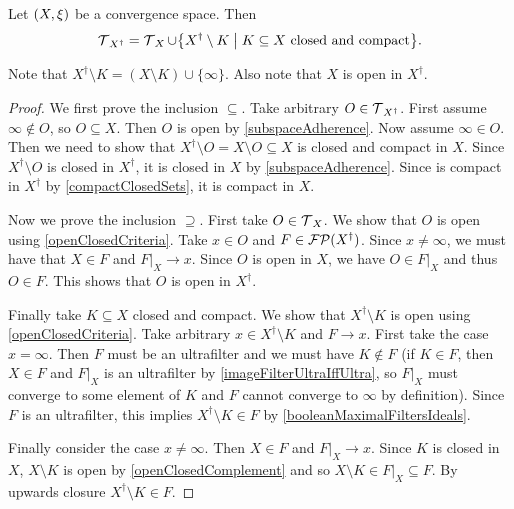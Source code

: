 \begin{proposition} \label{topologyOnePointCompactification}
Let $\sSet{X, \xi}$ be a convergence space. Then
\[ \topology_{X^\dagger} = \topology_X \cup \setbuilder{X^\dagger \setminus K}{\text{$K\subseteq X$ closed and compact}}. \]
\end{proposition}
Note that $X^\dagger \setminus K = (X\setminus K)\cup \{\infty\}$. Also note that $X$ is open in $X^\dagger$.
\begin{proof}
We first prove the inclusion $\boxed{\subseteq}$. Take arbitrary $O\in \operatorname{\mathcal{T}}_{X^\dagger}$. First assume $\infty\notin O$, so $O\subseteq X$. Then $O$ is open by \ref{subspaceAdherence}.
Now assume $\infty\in O$. Then we need to show that $X^\dagger \setminus O = X\setminus O \subseteq X$ is closed and compact in $X$. Since $X^\dagger \setminus O$ is closed in $X^\dagger$, it is closed in $X$ by \ref{subspaceAdherence}. Since is compact in $X^\dagger$ by \ref{compactClosedSets}, it is compact in $X$.

Now we prove the inclusion $\boxed{\supseteq}$. First take $O\in \operatorname{\mathcal{T}}_X$. We show that $O$ is open using \ref{openClosedCriteria}. Take $x\in O$ and $F\in \operatorname{\mathcal{FP}}(X^\dagger)$. Since $x\neq \infty$, we must have that $X\in F$ and $F|_X\to x$. Since $O$ is open in $X$, we have $O\in F|_X$ and thus $O\in F$. This shows that $O$ is open in $X^\dagger$.

Finally take $K\subseteq X$ closed and compact. We show that $X^\dagger \setminus K$ is open using \ref{openClosedCriteria}. Take arbitrary $x\in X^\dagger \setminus K$ and $F\to x$. First take the case $x = \infty$. Then $F$ must be an ultrafilter and we must have $K\notin F$ (if $K\in F$, then $X\in F$ and $F|_X$ is an ultrafilter by \ref{imageFilterUltraIffUltra}, so $F|_X$ must converge to some element of $K$ and $F$ cannot converge to $\infty$ by definition). Since $F$ is an ultrafilter, this implies $X^\dagger \setminus K\in F$ by \ref{booleanMaximalFiltersIdeals}.

Finally consider the case $x\neq \infty$. Then $X\in F$ and $F|_X \to x$. Since $K$ is closed in $X$, $X\setminus K$ is open by \ref{openClosedComplement} and so $X\setminus K \in F|_X \subseteq F$. By upwards closure $X^\dagger \setminus K\in F$.
\end{proof}

